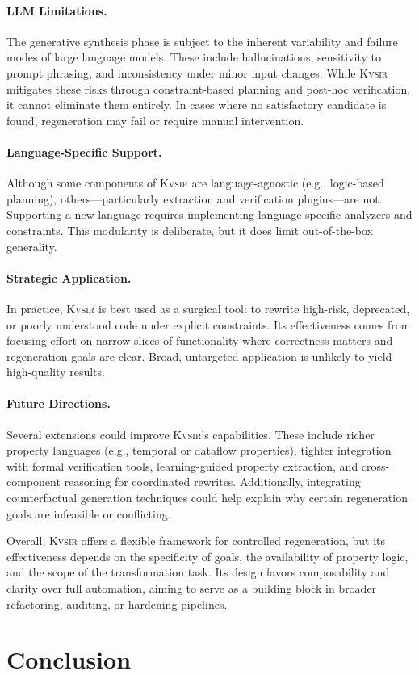 \documentclass[sigplan]{acmart}
\newcommand{\sys}{{\scshape Kv{\textalpha}sir}\xspace}
\begin{document}
\paragraph{LLM Limitations.}
The generative synthesis phase is subject to the inherent variability and failure modes of large language models. These include hallucinations, sensitivity to prompt phrasing, and inconsistency under minor input changes. While \sys mitigates these risks through constraint-based planning and post-hoc verification, it cannot eliminate them entirely. In cases where no satisfactory candidate is found, regeneration may fail or require manual intervention.

\paragraph{Language-Specific Support.}
Although some components of \sys are language-agnostic (e.g., logic-based planning), others—particularly extraction and verification plugins—are not. Supporting a new language requires implementing language-specific analyzers and constraints. This modularity is deliberate, but it does limit out-of-the-box generality.

\paragraph{Strategic Application.}
In practice, \sys is best used as a surgical tool: to rewrite high-risk, deprecated, or poorly understood code under explicit constraints. Its effectiveness comes from focusing effort on narrow slices of functionality where correctness matters and regeneration goals are clear. Broad, untargeted application is unlikely to yield high-quality results.

\paragraph{Future Directions.}
Several extensions could improve \sys’s capabilities. These include richer property languages (e.g., temporal or dataflow properties), tighter integration with formal verification tools, learning-guided property extraction, and cross-component reasoning for coordinated rewrites. Additionally, integrating counterfactual generation techniques could help explain why certain regeneration goals are infeasible or conflicting.

Overall, \sys offers a flexible framework for controlled regeneration, but its effectiveness depends on the specificity of goals, the availability of property logic, and the scope of the transformation task. Its design favors composability and clarity over full automation, aiming to serve as a building block in broader refactoring, auditing, or hardening pipelines.

\section{Conclusion}



\end{document}
